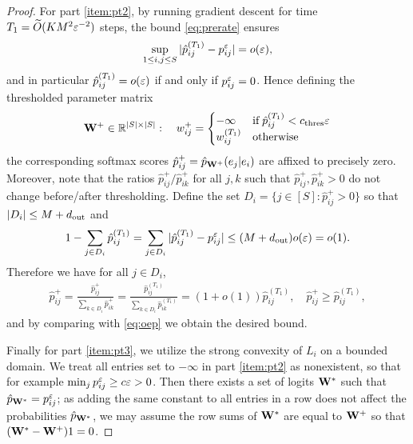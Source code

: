 \begin{proof}
For part \ref{item:pt2}, by running gradient descent for time $T_1 = \widetilde{O}(KM^2\varepsilon^{-2})$ steps, the bound \eqref{eq:prerate} ensures
\begin{equation}\label{eq:oep}
\sup_{1\le i,j\le S} |\hat{p}_{ij}^{(T_1)} - p_{ij}^\varepsilon| = o(\varepsilon),
\end{equation}
and in particular $\hat{p}_{ij}^{(T_1)} = o(\varepsilon)$ if and only if $p_{ij}^\varepsilon=0$. Hence defining the thresholded parameter matrix
\begin{equation*}
\mathbf{W}^+\in\mathbb{R}^{|S|\times |S|}:\quad w_{ij}^+ = \begin{cases}
-\infty & \text{if}\; \hat{p}_{ij}^{(T_1)} < c_\mathrm{thres}\varepsilon \\
w_{ij}^{(T_1)} & \text{otherwise}
\end{cases}
\end{equation*}
the corresponding softmax scores $\hat{p}_{ij}^+ = \hat{p}_{\mathbf{W}^+}(e_j|e_i)$ are affixed to precisely zero. Moreover, note that the ratios $\hat{p}_{ij}^+/\hat{p}_{ik}^+$ for all $j,k$ such that $\hat{p}_{ij}^+,\hat{p}_{ik}^+>0$ do not change before/after thresholding. Define the set $D_i = \{j\in[S]: \hat{p}_{ij}^+>0\}$ so that $|D_i|\le M+d_{\operatorname{out}}$ and
\begin{equation*}
1 - \sum_{j\in D_i} \hat{p}_{ij}^{(T_1)} = \sum_{j\in D_i} |\hat{p}_{ij}^{(T_1)} - p_{ij}^\varepsilon| \le (M+d_{\operatorname{out}})o(\varepsilon) = o(1).
\end{equation*}
Therefore we have for all $j\in D_i$,
\begin{align*}
\hat{p}_{ij}^+ = \frac{\hat{p}_{ij}^+}{\sum_{k\in D_i} \hat{p}_{ik}^+} = \frac{\hat{p}_{ij}^{(T_1)}}{\sum_{k\in D_i} \hat{p}_{ik}^{(T_1)}} = (1+o(1)) \hat{p}_{ij}^{(T_1)}, \quad \hat{p}_{ij}^+ \ge \hat{p}_{ij}^{(T_1)},
\end{align*}
and by comparing with \eqref{eq:oep} we obtain the desired bound.

Finally for part \ref{item:pt3}, we utilize the strong convexity of $L_i$ on a bounded domain. We treat all entries set to $-\infty$ in part \ref{item:pt2} as nonexistent, so that for example $\min_j p_{ij}^\varepsilon \ge c\varepsilon >0$. Then there exists a set of logits $\mathbf{W}^*$ such that $\hat{p}_{\mathbf{W}^*} = p_{ij}^\varepsilon$; as adding the same constant to all entries in a row does not affect the probabilities $\hat{p}_{\mathbf{W}^*}$, we may assume the row sums of $\mathbf{W}^*$ are equal to $\mathbf{W}^+$ so that $(\mathbf{W}^*-\mathbf{W}^+)1= 0$.


\end{proof}
